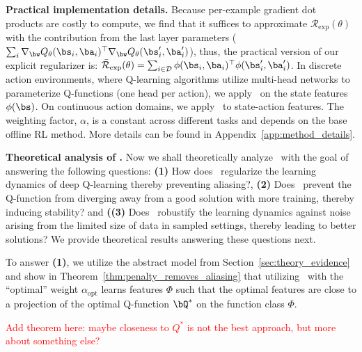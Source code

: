 \textbf{Practical implementation details.} Because per-example gradient dot products are costly to compute, we find that it suffices to approximate  $\mathcal{R}_\mathrm{exp}(\theta)$ with the contribution from the last layer parameters (\ie $\sum_i \nabla_\bw Q_\theta(\bs_i, \ba_i)^\top \nabla_\bw Q_\theta(\bs'_i, \ba'_i)$), thus, the practical version of our explicit regularizer is: $\bar{\mathcal{R}}_\mathrm{exp}(\theta) = \sum_{i \in \mathcal{D}} \phi(\bs_i, \ba_i)^\top \phi(\bs'_i, \ba'_i)$. In discrete action environments, where Q-learning algorithms utilize multi-head networks to parameterize Q-functions (one head per action), we apply \methodname\ on the state features $\phi(\bs)$. On continuous action domains, we apply \methodname\ to state-action features. The weighting factor, $\alpha$, is a constant across different tasks and depends on the base offline RL method. More details can be found in Appendix~\ref{app:method_details}.  

\iffalse
\textbf{Theoretical analysis of \methodname.} Now we shall theoretically analyze \methodname\ with the goal of answering the following questions: \textbf{(1)} How does \methodname\ regularize the learning dynamics of deep Q-learning thereby preventing aliasing?, \textbf{(2)} Does \methodname\ prevent the Q-function from diverging away from a good solution with more training, thereby inducing stability? and \textbf{((3)} Does \methodname\ robustify the learning dynamics against noise arising from the limited size of data in sampled settings, thereby leading to better solutions? 
We provide theoretical results answering these questions next.

To answer \textbf{(1)}, we utilize the abstract model from Section~\ref{sec:theory_evidence} and show in Theorem~\ref{thm:penalty_removes_aliasing} that utilizing \methodname\ with the ``optimal'' weight $\alpha_{\text{opt}}$ learns features $\Phi$ such that the optimal features are close to a projection of the optimal Q-function $\bQ^*$ on the function class $\Phi$.

\textcolor{red}{Add theorem here: maybe closeness to $Q^*$ is not the best approach, but more about something else?}

